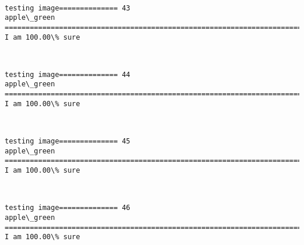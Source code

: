 \documentclass[11pt]{article}
\begin{document}
    \begin{center}
    \end{center}
    { \hspace*{\fill} \\}
    
    \begin{Verbatim}[commandchars=\\\{\}]
testing image============== 43
apple\_green
============================================================================
I am 100.00\% sure

    \end{Verbatim}

    \begin{center}
    \end{center}
    { \hspace*{\fill} \\}
    
    \begin{Verbatim}[commandchars=\\\{\}]
testing image============== 44
apple\_green
============================================================================
I am 100.00\% sure

    \end{Verbatim}

    \begin{center}
    \end{center}
    { \hspace*{\fill} \\}
    
    \begin{Verbatim}[commandchars=\\\{\}]
testing image============== 45
apple\_green
============================================================================
I am 100.00\% sure

    \end{Verbatim}

    \begin{center}
    \end{center}
    { \hspace*{\fill} \\}
    
    \begin{Verbatim}[commandchars=\\\{\}]
testing image============== 46
apple\_green
============================================================================
I am 100.00\% sure

    \end{Verbatim}
\end{document}
